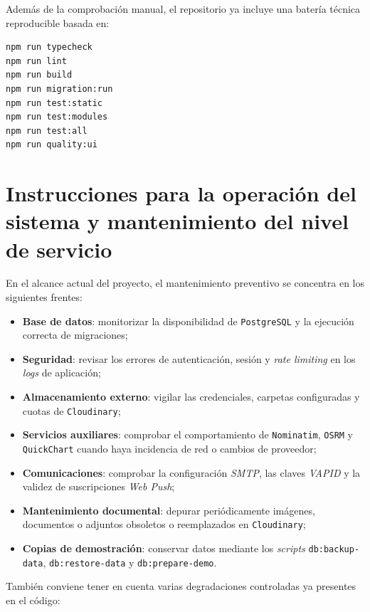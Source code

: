 Además de la comprobación manual, el repositorio ya incluye una batería técnica reproducible basada en:

\begin{lstlisting}[language=bash]
npm run typecheck
npm run lint
npm run build
npm run migration:run
npm run test:static
npm run test:modules
npm run test:all
npm run quality:ui
\end{lstlisting}

\section{Instrucciones para la operación del sistema y mantenimiento del nivel de servicio}

En el alcance actual del proyecto, el mantenimiento preventivo se concentra en los siguientes frentes:

\begin{itemize}
    \item \textbf{Base de datos}: monitorizar la disponibilidad de \texttt{PostgreSQL} y la ejecución correcta de migraciones;
    \item \textbf{Seguridad}: revisar los errores de autenticación, sesión y \textit{rate limiting} en los \textit{logs} de aplicación;
    \item \textbf{Almacenamiento externo}: vigilar las credenciales, carpetas configuradas y cuotas de \texttt{Cloudinary};
    \item \textbf{Servicios auxiliares}: comprobar el comportamiento de \texttt{Nominatim}, \texttt{OSRM} y \texttt{QuickChart} cuando haya incidencia de red o cambios de proveedor;
    \item \textbf{Comunicaciones}: comprobar la configuración \textit{SMTP}, las claves \textit{VAPID} y la validez de suscripciones \textit{Web Push};
    \item \textbf{Mantenimiento documental}: depurar periódicamente imágenes, documentos o adjuntos obsoletos o reemplazados en \texttt{Cloudinary};
    \item \textbf{Copias de demostración}: conservar datos mediante los \textit{scripts} \texttt{db:backup-data}, \texttt{db:restore-data} y \texttt{db:prepare-demo}.
\end{itemize}

También conviene tener en cuenta varias degradaciones controladas ya presentes en el código:

